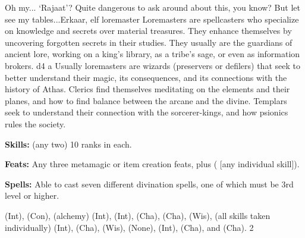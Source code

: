 {Oh my... `Rajaat'? Quite dangerous to ask around about this, you know? But let see my tables...}{Erkaar, elf loremaster}
{Loremasters are spellcasters who specialize on knowledge and secrets over material treasures. They enhance themselves by uncovering forgotten secrets in their studies. They usually are the guardians of ancient lore, working on a king's library, as a tribe's sage, or even as information brokers.}
{d4}
{a}
{Usually loremasters are wizards (preservers or defilers) that seek to better understand their magic, its consequences, and its connections with the history of Athas. Clerics find themselves meditating on the elements and their planes, and how to find balance between the arcane and the divine. Templars seek to understand their connection with the sorcerer-kings, and how psionics rules the society.}
{
\textbf{Skills:}  (any two) 10 ranks in each.

\textbf{Feats:} Any three metamagic or item creation feats, plus  ( [any individual  skill]).

\textbf{Spells:} Able to cast seven different divination spells, one of which must be 3rd level or higher.
}
{
 (Int),  (Con),  (alchemy) (Int),  (Int),  (Cha),  (Cha),  (Wis),  (all skills taken individually) (Int),  (Cha),  (Wis),  (None),  (Int),  (Cha), and  (Cha).
}
{2}
{}{}
